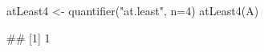 \begin{Schunk}
% --begin: "quant7"
\begin{Sinput}
atLeast4 <- quantifier("at.least", n=4)
atLeast4(A)
\end{Sinput}
\begin{Soutput}
## [1] 1
\end{Soutput}
%
% --end: "quant7"
\end{Schunk}
